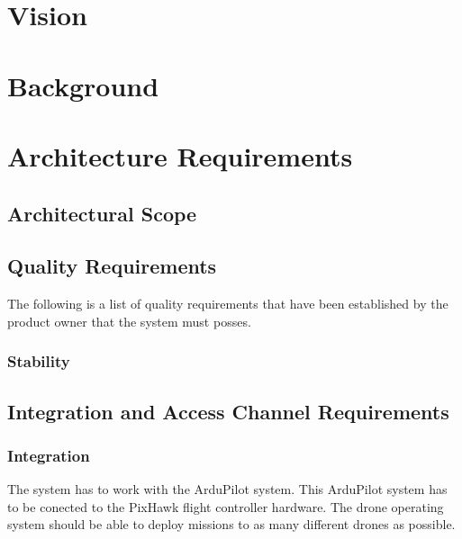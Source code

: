 \documentclass{article}
\begin{document}
	\section{Vision}%
	
	
	\section{Background} %

	\newpage
	
	\section{Architecture Requirements}%
		\subsection{Architectural Scope}%
		
			\setlength{\leftskip}{45px}
				\lipsum[2]

		\subsection{Quality Requirements}%
			The following is a list of quality requirements that have been established by the product owner that the system must posses.
			\subsubsection{Stability}
				\setlength{\leftskip}{61px}
			 	
		\subsection{Integration and Access Channel Requirements}%
		\subsubsection{Integration}
		The system has to work with the ArduPilot system. This ArduPilot system has to be conected to the PixHawk flight controller hardware. The drone operating system should be able to deploy missions to as many different drones as possible.
\end{document}
